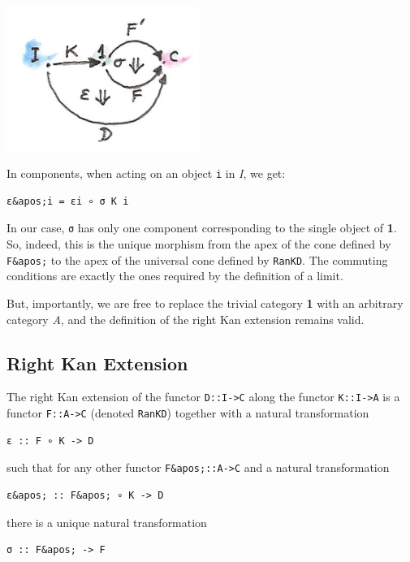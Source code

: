 \includegraphics[width=2.46875in]{images/kan5.jpg}

In components, when acting on an object \texttt{i} in \emph{I}, we get:

\begin{verbatim}
ε&apos;i = εi ∘ σ K i
\end{verbatim}

In our case, \texttt{σ} has only one component corresponding to the
single object of \textbf{1}. So, indeed, this is the unique morphism
from the apex of the cone defined by \texttt{F\&apos;} to the apex of
the universal cone defined by \texttt{RanKD}. The commuting conditions
are exactly the ones required by the definition of a limit.

But, importantly, we are free to replace the trivial category \textbf{1}
with an arbitrary category \emph{A}, and the definition of the right Kan
extension remains valid.

\subsection{Right Kan Extension}\label{right-kan-extension}

The right Kan extension of the functor \texttt{D::I-\textgreater{}C}
along the functor \texttt{K::I-\textgreater{}A} is a functor
\texttt{F::A-\textgreater{}C} (denoted \texttt{RanKD}) together with a
natural transformation

\begin{verbatim}
ε :: F ∘ K -> D
\end{verbatim}

such that for any other functor \texttt{F\&apos;::A-\textgreater{}C} and
a natural transformation

\begin{verbatim}
ε&apos; :: F&apos; ∘ K -> D
\end{verbatim}

there is a unique natural transformation

\begin{verbatim}
σ :: F&apos; -> F
\end{verbatim}

